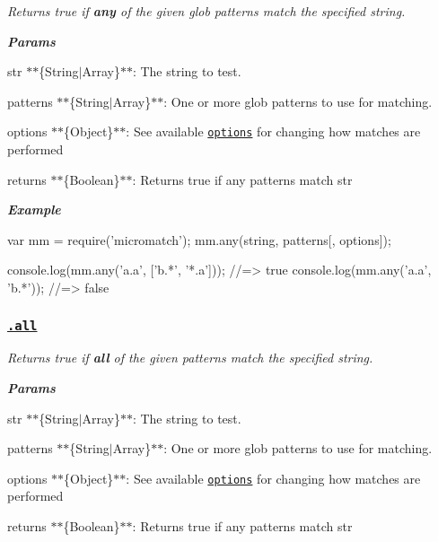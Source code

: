 {\itshape }

{\itshape Returns true if {\bfseries any} of the given glob {\ttfamily patterns} match the specified {\ttfamily string}.}

{\itshape {\bfseries Params}}

{\itshape 
\begin{DoxyItemize}
\item {\ttfamily str} $\ast$$\ast$\{String$\vert$\+Array\}$\ast$$\ast$\+: The string to test.
\item {\ttfamily patterns} $\ast$$\ast$\{String$\vert$\+Array\}$\ast$$\ast$\+: One or more glob patterns to use for matching.
\item {\ttfamily options} $\ast$$\ast$\{Object\}$\ast$$\ast$\+: See available \href{#options}{\tt options} for changing how matches are performed
\item {\ttfamily returns} $\ast$$\ast$\{Boolean\}$\ast$$\ast$\+: Returns true if any patterns match {\ttfamily str}
\end{DoxyItemize}}

{\itshape {\bfseries Example}}

{\itshape 
\begin{DoxyCode}
var mm = require('micromatch');
mm.any(string, patterns[, options]);

console.log(mm.any('a.a', ['b.*', '*.a']));
//=> true
console.log(mm.any('a.a', 'b.*'));
//=> false
\end{DoxyCode}
}

{\itshape \subsubsection*{\href{index.js#L308}{\tt .all}}}

{\itshape }

{\itshape Returns true if {\bfseries all} of the given {\ttfamily patterns} match the specified string.}

{\itshape {\bfseries Params}}

{\itshape 
\begin{DoxyItemize}
\item {\ttfamily str} $\ast$$\ast$\{String$\vert$\+Array\}$\ast$$\ast$\+: The string to test.
\item {\ttfamily patterns} $\ast$$\ast$\{String$\vert$\+Array\}$\ast$$\ast$\+: One or more glob patterns to use for matching.
\item {\ttfamily options} $\ast$$\ast$\{Object\}$\ast$$\ast$\+: See available \href{#options}{\tt options} for changing how matches are performed
\item {\ttfamily returns} $\ast$$\ast$\{Boolean\}$\ast$$\ast$\+: Returns true if any patterns match {\ttfamily str}
\end{DoxyItemize}}


